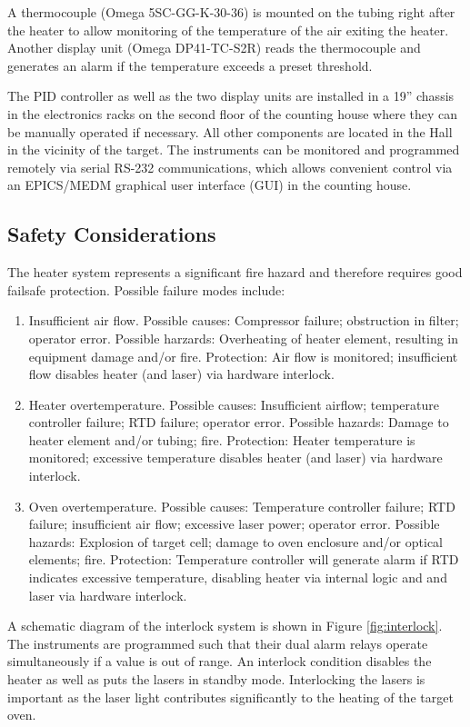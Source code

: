 A thermocouple (Omega 5SC-GG-K-30-36) is mounted on the
tubing right after the heater to allow monitoring of the temperature
of the air exiting the heater.  Another display unit (Omega
DP41-TC-S2R) reads the thermocouple and generates an alarm if the
temperature exceeds a preset threshold.

The PID controller as well as the two display units are installed
in a 19'' chassis in the electronics racks on the second floor of the
counting house where they can be manually operated if necessary.
All other components are located in the Hall in the vicinity of the
target. The instruments can be monitored
and programmed remotely via serial RS-232 communications, which
allows convenient control via an EPICS/MEDM graphical user interface 
(GUI) in the counting house.

\begin{safetyen}{10}{5}
\subsection{Safety Considerations}
\label{sec:heaterinterlock}

The heater system represents a significant fire hazard and therefore
requires good failsafe protection.
Possible failure modes include:
\begin{enumerate}

\item Insufficient air flow. Possible causes: Compressor failure;
obstruction
  in filter; operator error. Possible harzards: Overheating of heater
element,
  resulting in equipment damage and/or fire.
  Protection: Air flow is monitored; insufficient flow disables heater
  (and laser) via hardware interlock.
\item Heater overtemperature. Possible causes: Insufficient airflow;
  temperature controller failure; RTD failure; operator error.
  Possible hazards: Damage to heater element and/or tubing; fire.
  Protection: Heater temperature is monitored; excessive temperature
  disables heater (and laser) via hardware interlock.
\item Oven overtemperature. Possible causes: Temperature controller
failure;
  RTD failure; insufficient air flow; excessive laser power; 
  operator error. Possible hazards: Explosion of target cell; damage
  to oven enclosure and/or optical elements; fire.
  Protection: Temperature controller will generate alarm if RTD
indicates
  excessive temperature, disabling heater via internal logic and 
  and laser via hardware interlock. 
\end{enumerate}

A schematic diagram of 
the interlock system is shown in Figure \ref{fig:interlock}.
The instruments are programmed such that their dual alarm relays
operate simultaneously if a value is out of range.
An interlock condition disables the heater as well as puts the
lasers in standby mode. Interlocking the
lasers is important as the laser light contributes significantly to
the heating of the target oven. 

\end{safetyen}

